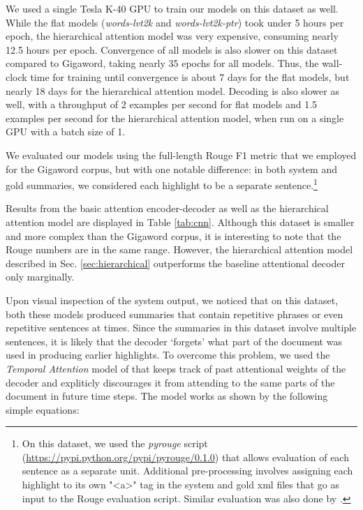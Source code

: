 \documentclass[11pt]{article}
\begin{document}
 We used a single Tesla K-40 GPU to train our models on this dataset as well. While the flat models ({\it words-lvt2k} and {\it words-lvt2k-ptr}) took under 5 hours per epoch, the hierarchical attention model was very expensive, consuming nearly 12.5 hours per epoch. Convergence of all models is also slower on this dataset compared to Gigaword, taking nearly 35 epochs for all models. Thus, the wall-clock time for training until convergence is about 7 days for the flat models, but nearly 18 days for the hierarchical attention model. Decoding is also slower as well, with a throughput of 2 examples per second for flat models and 1.5 examples per second for the hierarchical attention model, when run on a single GPU with a batch size of 1.

 We evaluated our models using the full-length Rouge F1 metric that we employed for the Gigaword corpus, but with one notable difference: in both system and gold summaries, we considered each highlight to be a separate sentence.\footnote{On this dataset, we used the {\it pyrouge} script (\url{https://pypi.python.org/pypi/pyrouge/0.1.0}) that allows evaluation of each sentence as a separate unit. Additional pre-processing involves assigning each highlight to its own "<a>" tag in the system and gold xml files that go as input to the Rouge evaluation script. Similar evaluation was also done by \cite{jianpeng}.}

 Results from the basic attention encoder-decoder as well as the hierarchical attention model are displayed in Table \ref{tab:cnn}. Although this dataset is smaller and more complex than the Gigaword corpus, it is interesting to note that the Rouge numbers are in the same range. However, the hierarchical attention model described in Sec. \ref{sec:hierarchical} outperforms  the baseline attentional decoder only marginally. 

Upon visual inspection of the system output, we noticed that on this dataset, both these models  produced summaries that contain repetitive phrases or even repetitive sentences at times. Since the summaries in this dataset involve multiple sentences, it is likely that the decoder `forgets' what part of the document was used in producing earlier highlights. To overcome this problem, we used the {\it Temporal Attention} model of  that keeps track of past attentional weights of the decoder and expliticly discourages it from attending to the same parts of the document in future time steps. The model works as shown by the following simple equations:
\end{document}

